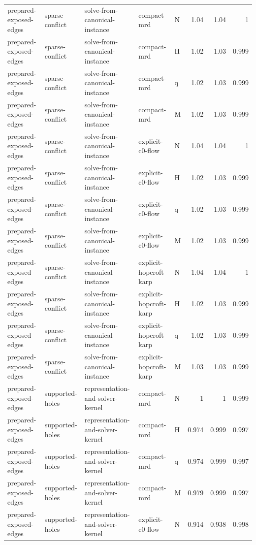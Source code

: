 \begin{table}[t]
\begin{tabular}{lllllrrr}
prepared-exposed-edges & sparse-conflict & solve-from-canonical-instance & compact-mrd & N & 1.04 & 1.04 & 1 \\
prepared-exposed-edges & sparse-conflict & solve-from-canonical-instance & compact-mrd & H & 1.02 & 1.03 & 0.999 \\
prepared-exposed-edges & sparse-conflict & solve-from-canonical-instance & compact-mrd & q & 1.02 & 1.03 & 0.999 \\
prepared-exposed-edges & sparse-conflict & solve-from-canonical-instance & compact-mrd & M & 1.02 & 1.03 & 0.999 \\
prepared-exposed-edges & sparse-conflict & solve-from-canonical-instance & explicit-c0-flow & N & 1.04 & 1.04 & 1 \\
prepared-exposed-edges & sparse-conflict & solve-from-canonical-instance & explicit-c0-flow & H & 1.02 & 1.03 & 0.999 \\
prepared-exposed-edges & sparse-conflict & solve-from-canonical-instance & explicit-c0-flow & q & 1.02 & 1.03 & 0.999 \\
prepared-exposed-edges & sparse-conflict & solve-from-canonical-instance & explicit-c0-flow & M & 1.02 & 1.03 & 0.999 \\
prepared-exposed-edges & sparse-conflict & solve-from-canonical-instance & explicit-hopcroft-karp & N & 1.04 & 1.04 & 1 \\
prepared-exposed-edges & sparse-conflict & solve-from-canonical-instance & explicit-hopcroft-karp & H & 1.02 & 1.03 & 0.999 \\
prepared-exposed-edges & sparse-conflict & solve-from-canonical-instance & explicit-hopcroft-karp & q & 1.02 & 1.03 & 0.999 \\
prepared-exposed-edges & sparse-conflict & solve-from-canonical-instance & explicit-hopcroft-karp & M & 1.03 & 1.03 & 0.999 \\
prepared-exposed-edges & supported-holes & representation-and-solver-kernel & compact-mrd & N & 1 & 1 & 0.999 \\
prepared-exposed-edges & supported-holes & representation-and-solver-kernel & compact-mrd & H & 0.974 & 0.999 & 0.997 \\
prepared-exposed-edges & supported-holes & representation-and-solver-kernel & compact-mrd & q & 0.974 & 0.999 & 0.997 \\
prepared-exposed-edges & supported-holes & representation-and-solver-kernel & compact-mrd & M & 0.979 & 0.999 & 0.997 \\
prepared-exposed-edges & supported-holes & representation-and-solver-kernel & explicit-c0-flow & N & 0.914 & 0.938 & 0.998 \\

\end{tabular}
\end{table}
